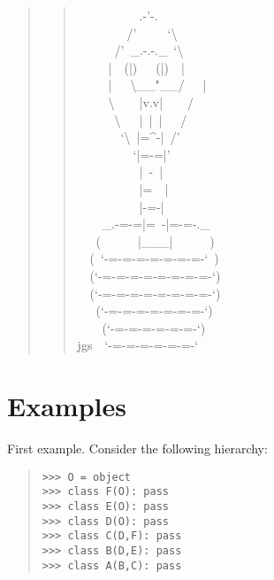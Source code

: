 \documentclass[10pt,a4paper,english]{article}
\begin{document}
\begin{quote}
\begin{quote}{\ttfamily \raggedright \noindent
~~~~~~~~~~.-'-.~\\
~~~~~~~~/'~~~~~`{\textbackslash}~\\
~~~~~~/'~{\_}.-.-.{\_}~`{\textbackslash}~\\
~~~~~|~~(|)~~~(|)~~|~\\
~~~~~|~~~{\textbackslash}{\_}{\_}"{\_}{\_}/~~~|~\\
~~~~~{\textbackslash}~~~~|v.v|~~~~/~\\
~~~~~~{\textbackslash}~~~|~|~|~~~/~\\
~~~~~~~`{\textbackslash}~|={\textasciicircum}-|~/'~\\
~~~~~~~~~`|=-=|'~\\
~~~~~~~~~~|~-~|~\\
~~~~~~~~~~|=~~|~\\
~~~~~~~~~~|-=-|~\\
~~~~{\_}.-=-=|=~-|=-=-.{\_}~\\
~~~(~~~~~~|{\_}{\_}{\_}|~~~~~~)~\\
~~(~`-=-=-=-=-=-=-=-`~)~\\
~~(`-=-=-=-=-=-=-=-=-`)~\\
~~(`-=-=-=-=-=-=-=-=-`)~\\
~~~(`-=-=-=-=-=-=-=-`)~\\
~~~~(`-=-=-=-=-=-=-`)~\\
jgs~~`-=-=-=-=-=-=-`
}\end{quote}
\end{quote}



\hypertarget{examples}{}
\section*{Examples}

First example. Consider the following hierarchy:
\begin{quote}
\begin{verbatim}>>> O = object
>>> class F(O): pass
>>> class E(O): pass
>>> class D(O): pass
>>> class C(D,F): pass
>>> class B(D,E): pass
>>> class A(B,C): pass\end{verbatim}
\end{quote}
\end{document}
